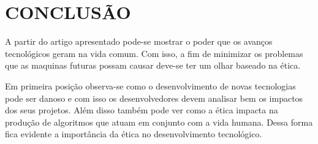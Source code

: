 \section{CONCLUSÃO}

A partir do artigo apresentado pode-se mostrar o poder que os avanços tecnológicos geram na vida comum. Com isso, a fim de minimizar os problemas que as maquinas futuras possam causar deve-se ter um olhar baseado na ética.

Em primeira posição observa-se como o desenvolvimento de novas tecnologias pode ser danoso e com isso os desenvolvedores devem analisar bem os impactos dos seus projetos. Além disso também pode ver como a ética impacta na produção de algoritmos que atuam em conjunto com a vida humana. Dessa forma fica evidente a importância da ética no desenvolvimento tecnológico.
